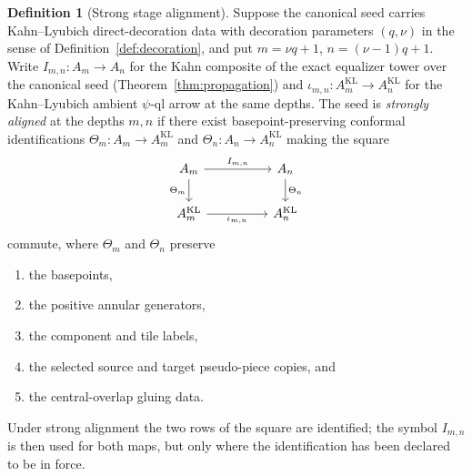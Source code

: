 \documentclass[11pt,reqno]{amsart}
\theoremstyle{definition}
\newtheorem{definition}[theorem]{Definition}
\theoremstyle{remark}
\begin{document}
\begin{definition}[Strong stage alignment]\label{def:strong-alignment}
Suppose the canonical seed carries Kahn--Lyubich direct-decoration
data with decoration parameters $(q,\nu)$ in the sense of
Definition~\ref{def:decoration}, and put
$m=\nu q+1$, $n=(\nu-1)q+1$.  Write $I_{m,n}\colon A_{m}\to A_{n}$ for
the Kahn composite of the exact equalizer tower over the canonical
seed (Theorem~\ref{thm:propagation}) and
$\iota_{m,n}\colon A^{\mathrm{KL}}_{m}\to A^{\mathrm{KL}}_{n}$ for the
Kahn--Lyubich ambient $\psi$-ql arrow at the same depths.  The seed is
\emph{strongly aligned} at the depths $m,n$ if there exist
basepoint-preserving conformal identifications
$\Theta_{m}\colon A_{m}\to A^{\mathrm{KL}}_{m}$ and
$\Theta_{n}\colon A_{n}\to A^{\mathrm{KL}}_{n}$ making the
square
\[
\begin{tikzcd}[column sep=huge]
A_{m}\arrow[r,"I_{m,n}"]\arrow[d,"\Theta_{m}"'] &
A_{n}\arrow[d,"\Theta_{n}"]\\
A^{\mathrm{KL}}_{m}\arrow[r,"\iota_{m,n}"'] &
A^{\mathrm{KL}}_{n}
\end{tikzcd}
\]
commute, where $\Theta_{m}$ and $\Theta_{n}$ preserve
\begin{enumerate}
\item[(i)] the basepoints,
\item[(ii)] the positive annular generators,
\item[(iii)] the component and tile labels,
\item[(iv)] the selected source and target pseudo-piece copies, and
\item[(v)] the central-overlap gluing data.
\end{enumerate}
Under strong alignment the two rows of the square are identified; the
symbol $I_{m,n}$ is then used for both maps, but only where the
identification has been declared to be in force.
\end{definition}
\end{document}
